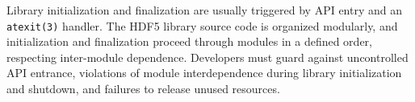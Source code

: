 Library initialization and finalization are usually triggered by API entry and an \texttt{atexit(3)} handler. The HDF5 library source code is organized modularly, and initialization and finalization proceed through modules in a defined order, respecting inter-module dependence. Developers must guard against uncontrolled API entrance, violations of module interdependence during library initialization and shutdown, and failures to release unused resources.